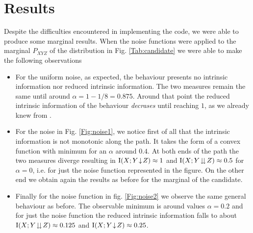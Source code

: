 \section{Results}
Despite the difficulties encountered in implementing the code, we were able to produce some marginal results.
When the noise functions were applied to the marginal $P_{XYZ}$ of the distribution in Fig. \ref{Tab:candidate} we were able to make the following observations
\begin{itemize}
\item For the uniform noise, as expected, the behaviour presents no intrinsic information nor reduced intrinsic information. The two measures remain the same until around $\alpha = 1- 1/8 = 0.875$. Around that point the reduced intrinsic information of the behaviour \textit{decrases} until reaching $1$, as we already knew from \cite{RW03}.

\item For the noise in Fig. \ref{Fig:noise1}, we notice first of all that the intrinsic information is not monotonic along the path. It takes the form of a convex function with minimum for an $\alpha$ around $0.4$. At both ends of the path the two measures diverge resulting in $\operatorname{I}(X;Y\!\downarrow\!Z) \approx 1$ and $\operatorname{I}(X;Y\!\downdownarrows\!Z) \approx 0.5$ for $\alpha = 0$, i.e. for just the noise function represented in the figure. On the other end we obtain again the results as before for the marginal of the candidate.

\item Finally for the noise function in fig. \ref{Fig:noise2} we observe the same general behaviour as before. 
The observable minimum is around values $\alpha = 0.2$ and for just the noise function the reduced intrinsic information falls to about $\operatorname{I}(X;Y\!\downdownarrows\!Z) \approx 0.125$ and $\operatorname{I}(X;Y\!\downarrow\!Z) \approx 0.25$.
\end{itemize}


    
    